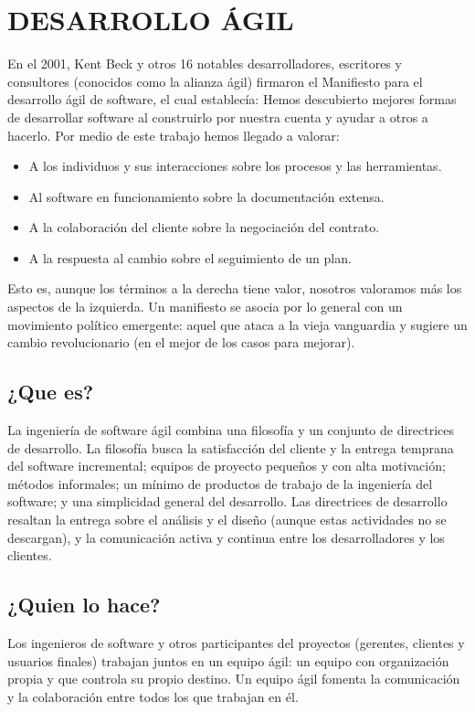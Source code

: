 \section{\textbf{DESARROLLO ÁGIL}}
			En el 2001, Kent Beck y otros 16 notables desarrolladores, escritores y consultores (conocidos como la alianza ágil) firmaron el Manifiesto para el desarrollo ágil de software, el cual establecía:\vspace*{0.3in}
			Hemos descubierto mejores formas de desarrollar software al construirlo por nuestra cuenta y ayudar a otros a hacerlo. Por medio de este trabajo hemos llegado a valorar:
			\begin{itemize}
				\item A los individuos y sus interacciones sobre los procesos y las herramientas.
				\item Al software en funcionamiento sobre la documentación extensa.
				\item A la colaboración del cliente sobre la negociación del contrato.
				\item A la respuesta al cambio sobre el seguimiento de un plan.\\
			\end{itemize}
			Esto es, aunque los términos a la derecha tiene valor, nosotros valoramos más los aspectos de la izquierda.\vspace*{0.3in}
			Un manifiesto se asocia por lo general con un movimiento político emergente: aquel que ataca a la vieja vanguardia y sugiere un cambio revolucionario (en el mejor de los casos para mejorar).
			\subsection{¿Que es?}
			La ingeniería de software ágil combina una filosofía y un conjunto de directrices de desarrollo. La filosofía busca la satisfacción del cliente y la entrega temprana del software incremental; equipos de proyecto pequeños y con alta motivación; métodos informales; un mínimo de productos de trabajo de la ingeniería del software; y una simplicidad general del desarrollo. Las directrices de desarrollo resaltan la entrega sobre el análisis y el diseño (aunque estas actividades no se descargan), y la comunicación activa y continua entre los desarrolladores y los clientes.
			\subsection{¿Quien lo hace?}
			Los ingenieros de software y otros participantes del proyectos (gerentes, clientes y usuarios finales) trabajan juntos en un equipo ágil: un equipo con organización propia y que controla su propio destino. Un equipo ágil fomenta la comunicación y la colaboración entre todos los que trabajan en él.
